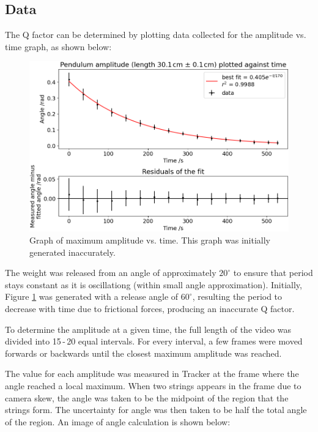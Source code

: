 \documentclass[11pt]{article}
\begin{document}
\begin{multicols}{2}
\subsection{Data} \label{sec 4.2 data}
The Q factor can be determined by plotting
 data collected for the amplitude vs. time graph, as shown below:

\begin{figure}[H]
    \centering
    \includegraphics[width=\linewidth]{../figures/max_amplitude_vs_time.png}
    \caption{\centering Graph of maximum amplitude vs. time. This graph was initially generated inaccurately.}
    \label{fig:figure 4}
\end{figure}

The weight was released from an angle of approximately $20^\circ$ to ensure that period stays constant as it is oscillationg (within small angle approximation). Initially, Figure \ref{fig:figure 4} was generated with a release angle of $60^\circ$, resulting the period to decrease with time due to frictional forces, producing an inaccurate Q factor.

To determine the amplitude at a given time, the full length of the video was divided into 15\,-\,20 equal intervals. For every interval, a few frames were moved forwards or backwards until the closest maximum amplitude was reached.

The value for each amplitude was measured in Tracker \cite{tracker} at the frame where the angle reached a local maximum. When two strings appears in the frame due to camera skew, the angle was taken to be the midpoint of the region that the strings form. The uncertainty for angle was then taken to be half the total angle of the region. An image of angle calculation is shown below:


\end{multicols}
\end{document}
